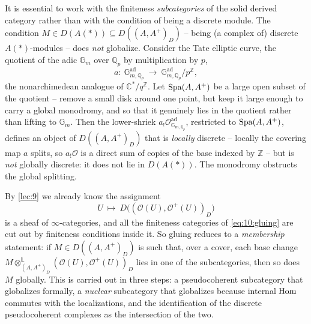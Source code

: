 \begin{remark}
\label{rmk:10:warning}
It is essential to work with the finiteness \emph{subcategories} of the solid
derived category rather than with the condition of being a discrete module. The
condition $M\in D(A(\ast))\subseteq D((A,A^{+})_{D})$ -- being (a complex of)
discrete $A(\ast)$-modules -- does \emph{not} globalize.
Consider the Tate elliptic curve, the quotient of the adic $\mathbb{G}_{m}$ over
$\mathbb{Q}_{p}$ by multiplication by $p$,
\begin{equation*}
a\colon\ \mathbb{G}_{m,\mathbb{Q}_p}^{\mathrm{ad}}\ \longrightarrow\
\mathbb{G}_{m,\mathbb{Q}_p}^{\mathrm{ad}}/p^{\mathbb{Z}},
\end{equation*}
the nonarchimedean analogue of $\mathbb{C}^{*}/q^{\mathbb{Z}}$. Let
$\operatorname{Spa}(A,A^{+})$ be a large open subset of the quotient -- remove a small disk
around one point, but keep it large enough to carry a global monodromy, and so
that it genuinely lies in the quotient rather than lifting to
$\mathbb{G}_{m}$. Then the lower-shriek $a_{!}\mathcal O^{\mathrm{ad}}_{\mathbb{G}_{m,\mathbb{Q}_p}}$,
restricted to $\operatorname{Spa}(A,A^{+})$, defines an object of $D((A,A^{+})_{D})$ that is
\emph{locally} discrete -- locally the covering map $a$ splits, so
$a_{!}\mathcal O$ is a direct sum of copies of the base indexed by
$\mathbb{Z}$ -- but is \emph{not} globally discrete: it does not lie in
$D(A(\ast))$. The monodromy obstructs the global splitting.
\end{remark}

\begin{remark}
\label{rmk:10:outline}
By \cref{lec:9} we already know the assignment
\begin{equation*}
U\ \longmapsto\ D\bigl((\mathcal O(U),\mathcal O^{+}(U))_{D}\bigr)
\end{equation*}
is a sheaf of $\infty$-categories, and all the finiteness categories of
\eqref{eq:10:gluing} are cut out by finiteness conditions inside it. So gluing
reduces to a \emph{membership} statement: if $M\in D((A,A^{+})_{D})$ is such that,
over a cover, each base change
$M\otimes^{\mathbb{L}}_{(A,A^{+})_{D}}(\mathcal O(U),\mathcal O^{+}(U))_{D}$ lies
in one of the subcategories, then so does $M$ globally. This is carried out in
three steps: a pseudocoherent subcategory that globalizes formally, a
\emph{nuclear} subcategory that globalizes because internal $\operatorname{Hom}$ commutes with
the localizations, and the identification of the discrete pseudocoherent complexes
as the intersection of the two.
\end{remark}

